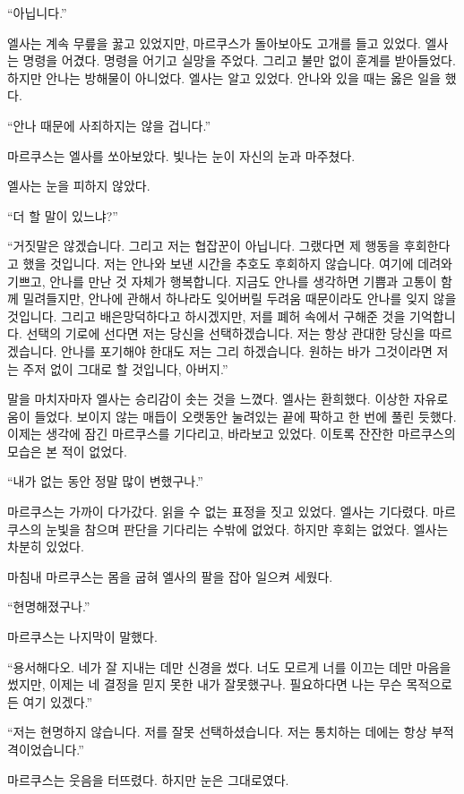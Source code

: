``아닙니다.''

엘사는 계속 무릎을 꿇고 있었지만, 마르쿠스가 돌아보아도 고개를 들고 있었다. 엘사는 명령을 어겼다. 명령을 어기고 실망을 주었다. 그리고 불만 없이 훈계를 받아들었다. 하지만 안나는 방해물이 아니었다. 엘사는 알고 있었다. 안나와 있을 때는 옳은 일을 했다.

``안나 때문에 사죄하지는 않을 겁니다.''

마르쿠스는 엘사를 쏘아보았다. 빛나는 눈이 자신의 눈과 마주쳤다.

엘사는 눈을 피하지 않았다.

``더 할 말이 있느냐?''

``거짓말은 않겠습니다. 그리고 저는 협잡꾼이 아닙니다. 그랬다면 제 행동을 후회한다고 했을 것입니다. 저는 안나와 보낸 시간을 추호도 후회하지 않습니다. 여기에 데려와 기쁘고, 안나를 만난 것 자체가 행복합니다. 지금도 안나를 생각하면 기쁨과 고통이 함께 밀려들지만, 안나에 관해서 하나라도 잊어버릴 두려움 때문이라도 안나를 잊지 않을 것입니다. 그리고 배은망덕하다고 하시겠지만, 저를 폐허 속에서 구해준 것을 기억합니다. 선택의 기로에 선다면 저는 당신을 선택하겠습니다. 저는 항상 관대한 당신을 따르겠습니다. 안나를 포기해야 한대도 저는 그리 하겠습니다. 원하는 바가 그것이라면 저는 주저 없이 그대로 할 것입니다, 아버지.''

말을 마치자마자 엘사는 승리감이 솟는 것을 느꼈다. 엘사는 환희했다. 이상한 자유로움이 들었다. 보이지 않는 매듭이 오랫동안 눌려있는 끝에 팍하고 한 번에 풀린 듯했다. 이제는 생각에 잠긴 마르쿠스를 기다리고, 바라보고 있었다. 이토록 잔잔한 마르쿠스의 모습은 본 적이 없었다.

``내가 없는 동안 정말 많이 변했구나.''

마르쿠스는 가까이 다가갔다. 읽을 수 없는 표정을 짓고 있었다. 엘사는 기다렸다. 마르쿠스의 눈빛을 참으며 판단을 기다리는 수밖에 없었다. 하지만 후회는 없었다. 엘사는 차분히 있었다.

마침내 마르쿠스는 몸을 굽혀 엘사의 팔을 잡아 일으켜 세웠다.

``현명해졌구나.''

마르쿠스는 나지막이 말했다.

``용서해다오. 네가 잘 지내는 데만 신경을 썼다. 너도 모르게 너를 이끄는 데만 마음을 썼지만, 이제는 네 결정을 믿지 못한 내가 잘못했구나. 필요하다면 나는 무슨 목적으로든 여기 있겠다.''

``저는 현명하지 않습니다. 저를 잘못 선택하셨습니다. 저는 통치하는 데에는 항상 부적격이었습니다.''

마르쿠스는 웃음을 터뜨렸다. 하지만 눈은 그대로였다.

